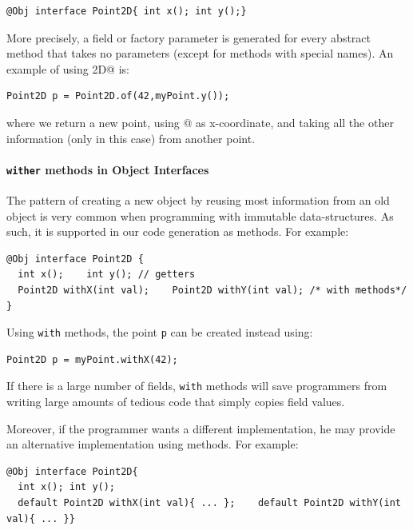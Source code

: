 \begin{lstlisting}
@Obj interface Point2D{ int x(); int y();}
\end{lstlisting}

\noindent More precisely, a field or factory parameter is generated for every
abstract method that takes no parameters (except for methods with special
names). An example of using \Q@Point2D@ is:
\begin{lstlisting}
Point2D p = Point2D.of(42,myPoint.y());
\end{lstlisting}
\noindent where we return a new point, using @ as x-coordinate,
and taking all the other information (only \Q@y@ in this case) from
another point.

\paragraph{\texttt{wither} methods in Object Interfaces}
The pattern of creating a new object by reusing most information from an old
object is very common when programming with immutable
data-structures. As such, it is
supported in our code generation as \Q@with@ methods. For example:
\begin{lstlisting}
@Obj interface Point2D {
  int x();    int y(); // getters
  Point2D withX(int val);    Point2D withY(int val); /* with methods*/ }
\end{lstlisting}

\noindent Using \texttt{with} methods, the point \texttt{p} can be created instead using:

\begin{lstlisting}
Point2D p = myPoint.withX(42);
\end{lstlisting}

\noindent If there is a large number of fields, \texttt{with} methods
will save programmers from writing large amounts of tedious code that
simply copies field values.

Moreover, if the programmer wants a different implementation, he may
provide an alternative implementation using \Q@default@ methods. For example:
\begin{lstlisting}
@Obj interface Point2D{
  int x(); int y();
  default Point2D withX(int val){ ... };    default Point2D withY(int val){ ... }}
\end{lstlisting}

